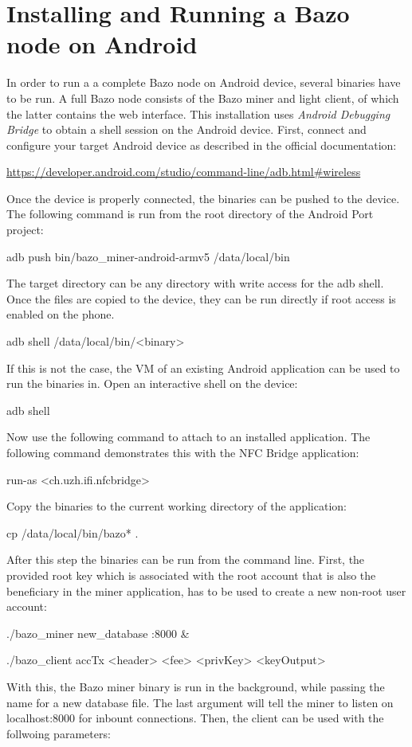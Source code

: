 \section{Installing and Running a Bazo node on Android}\label{bazoandroid}
In order to run a a complete Bazo node on Android device, several binaries have to be run. A full Bazo node consists of the Bazo miner and light client, of which the latter contains the web interface.
This installation uses \textit{Android Debugging Bridge} to obtain a shell session on the Android device. First, connect and configure your target Android device as described in the official documentation:
\begin{framed}\url{https://developer.android.com/studio/command-line/adb.html#wireless}
\end{framed}
Once the device is properly connected, the binaries can be pushed to the device. The following command is run from the root directory of the Android Port project:
\begin{framed}adb push bin/bazo\_miner-android-armv5 /data/local/bin\end{framed}
The target directory can be any directory with write access for the adb shell. Once the files are copied to the device, they can be run directly if root access is enabled on the phone.
\begin{framed}adb shell /data/local/bin/<binary>\end{framed}
If this is not the case, the VM of an existing Android application can be used to run the binaries in. Open an interactive shell on the device:
\begin{framed}adb shell\end{framed}
Now use the following command to attach to an installed application. The following command demonstrates this with the NFC Bridge application:
\begin{framed}run-as <ch.uzh.ifi.nfcbridge>\end{framed}
Copy the binaries to the current working directory of the application:
\begin{framed}cp /data/local/bin/bazo* .\end{framed}
After this step the binaries can be run from the command line.
First, the provided root key which is associated with the root account that is also the beneficiary in the miner application, has to be used to create a new non-root user account:
\begin{framed}./bazo\_miner new\_database :8000 \&

./bazo\_client accTx <header> <fee> <privKey> <keyOutput>
\end{framed}
With this, the Bazo miner binary is run in the background, while passing the name for a new database file. The last argument will tell the miner to listen on localhost:8000 for inbount connections. Then, the client can be used with the follwoing parameters:

